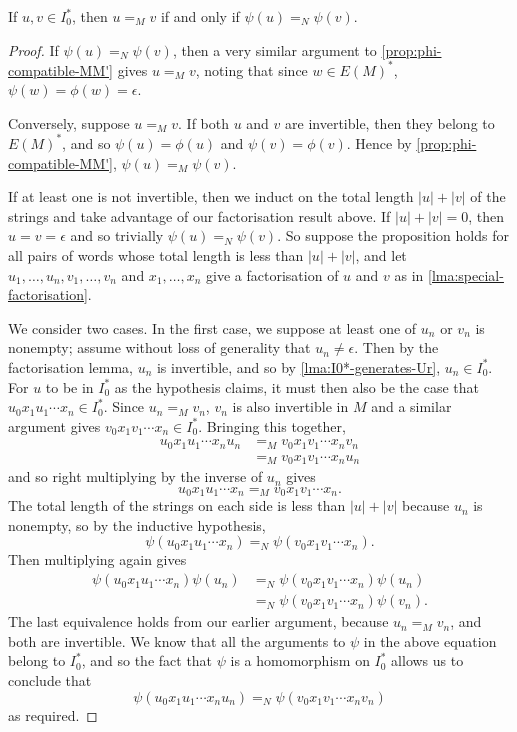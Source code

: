 \documentclass[noindex,noinsetproof,emphthm,12pt]{lmaths}
\begin{document}
\begin{prop}
	If $u, v \in I_0^*$, then $u =_M v$ if and only if $\psi(u) =_N \psi(v)$. \label{prop:psi-MN-compatible}
\end{prop}
\begin{proof}
	If $\psi(u) =_N \psi(v)$, then a very similar argument to \cref{prop:phi-compatible-MM'} gives $u =_M v$, noting that since $w \in E(M)^*$, $\psi(w) = \phi(w) = \epsilon$.

	Conversely, suppose $u =_M v$. If both $u$ and $v$ are invertible, then they belong to $E(M)^*$, and so $\psi(u) = \phi(u)$ and $\psi(v) = \phi(v)$. Hence by \cref{prop:phi-compatible-MM'}, $\psi(u) =_M \psi(v)$.

	If at least one is not invertible, then we induct on the total length $|u| + |v|$ of the strings and take advantage of our factorisation result above. If $|u|+|v| = 0$, then $u = v = \epsilon$ and so trivially $\psi(u) =_N \psi(v)$. So suppose the proposition holds for all pairs of words whose total length is less than $|u| + |v|$, and let $u_1, \ldots, u_n, v_1, \ldots, v_n$ and $x_1, \ldots, x_n$ give a factorisation of $u$ and $v$ as in \cref{lma:special-factorisation}.

	We consider two cases. In the first case, we suppose at least one of $u_n$ or $v_n$ is nonempty; assume without loss of generality that $u_n \ne \epsilon$. Then by the factorisation lemma, $u_n$ is invertible, and so by \cref{lma:I0*-generates-Ur}, $u_n \in I_0^*$. For $u$ to be in $I_0^*$ as the hypothesis claims, it must then also be the case that $u_0x_1u_1\cdots x_n \in I_0^*$. Since $u_n =_M v_n$, $v_n$ is also invertible in $M$ and a similar argument gives $v_0x_1v_1\cdots x_n \in I_0^*$. Bringing this together,
	\begin{align*}
		u_0x_1u_1 \cdots x_n u_n &=_M v_0x_1v_1\cdots x_n v_n \\
		&=_M v_0x_1v_1\cdots x_n u_n
	\end{align*}
	and so right multiplying by the inverse of $u_n$ gives
		\[ u_0x_1u_1 \cdots x_n =_M v_0x_1v_1\cdots x_n. \]
	The total length of the strings on each side is less than $|u| + |v|$ because $u_n$ is nonempty, so by the inductive hypothesis,
		\[ \psi(u_0x_1u_1 \cdots x_n) =_N \psi(v_0x_1v_1\cdots x_n). \]
	Then multiplying again gives
	\begin{align*}
		\psi(u_0x_1u_1 \cdots x_n)\psi(u_n) &=_N \psi(v_0x_1v_1\cdots x_n)\psi(u_n) \\
		&=_N \psi(v_0x_1v_1\cdots x_n)\psi(v_n).
	\end{align*}
	The last equivalence holds from our earlier argument, because $u_n =_M v_n$, and both are invertible. We know that all the arguments to $\psi$ in the above equation belong to $I_0^*$, and so the fact that $\psi$ is a homomorphism on $I_0^*$ allows us to conclude that
	\[ \psi(u_0x_1u_1 \cdots x_n u_n) =_N \psi(v_0 x_1 v_1 \cdots x_n v_n) \]
	as required.


\end{proof}
\end{document}
